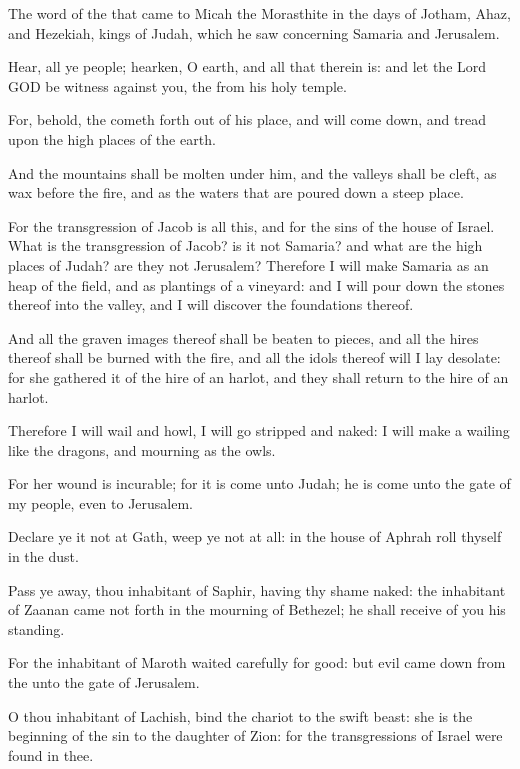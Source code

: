 \Chapter
\Verse The word of the \LORD that came to Micah the Morasthite in the days of Jotham, Ahaz, and Hezekiah, kings of Judah, which he saw concerning Samaria and Jerusalem.

\Verse Hear, all ye people; hearken, O earth, and all that therein is: and let the Lord GOD be witness against you, the \LORD from his holy temple.

\Verse For, behold, the \LORD cometh forth out of his place, and will come down, and tread upon the high places of the earth.

\Verse And the mountains shall be molten under him, and the valleys shall be cleft, as wax before the fire, and as the waters that are poured down a steep place.

\Verse For the transgression of Jacob is all this, and for the sins of the house of Israel. What is the transgression of Jacob? is it not Samaria? and what are the high places of Judah? are they not Jerusalem?  \Verse Therefore I will make Samaria as an heap of the field, and as plantings of a vineyard: and I will pour down the stones thereof into the valley, and I will discover the foundations thereof.

\Verse And all the graven images thereof shall be beaten to pieces, and all the hires thereof shall be burned with the fire, and all the idols thereof will I lay desolate: for she gathered it of the hire of an harlot, and they shall return to the hire of an harlot.

\Verse Therefore I will wail and howl, I will go stripped and naked: I will make a wailing like the dragons, and mourning as the owls.

\Verse For her wound is incurable; for it is come unto Judah; he is come unto the gate of my people, even to Jerusalem.

\Verse Declare ye it not at Gath, weep ye not at all: in the house of Aphrah roll thyself in the dust.

\Verse Pass ye away, thou inhabitant of Saphir, having thy shame naked: the inhabitant of Zaanan came not forth in the mourning of Bethezel; he shall receive of you his standing.

\Verse For the inhabitant of Maroth waited carefully for good: but evil came down from the \LORD unto the gate of Jerusalem.

\Verse O thou inhabitant of Lachish, bind the chariot to the swift beast: she is the beginning of the sin to the daughter of Zion: for the transgressions of Israel were found in thee.

